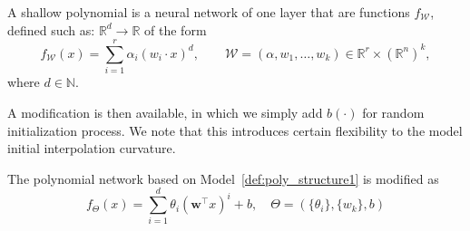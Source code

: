 \documentclass[10pt]{article} %
\begin{document}
\begin{definition}\label{def:poly_structure1}
    A shallow polynomial is a neural network of one layer that are functions $f_{\mathcal W}$, defined such as:
$\mathbb R^d \rightarrow \mathbb{R}$ of the form
\begin{equation}\label{eq:network_model} f_{\mathcal W}(x) = \sum_{i=1}^r
\alpha_{i} (w_i \cdot x)^d, \qquad \mathcal W = (\alpha,w_1,\ldots,w_k) \in
\mathbb{R}^r \times (\mathbb{R}^{n})^k,
\end{equation} 
where $d \in \mathbb{N}$.
\end{definition}
A modification is then available, in which we simply add $b(\cdot)$ for random initialization process. We note that this introduces certain flexibility to the model initial interpolation curvature.   
\begin{definition}\label{def:poly_model_test}
    The polynomial network based on Model~\ref{def:poly_structure1} is modified as 
    \begin{equation}
        f_{\Theta}(x) = \sum_{i=1}^{d} \theta_i \left( \mathbf{w}^\top x \right)^i + b, \quad \Theta = (\{\theta_{i}\},\{w_{k}\},b)
    \end{equation}
\end{definition}
\end{document}
